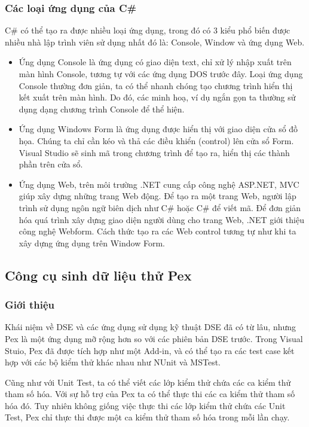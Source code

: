 \subsubsection*{Các loại ứng dụng của C\#}
C\# có thể tạo ra được nhiều loại ứng dụng, trong đó có 3 kiểu phổ biến được nhiều nhà lập trình viên sử dụng nhất đó là: Console, Window và ứng dụng Web.
\begin{itemize}
	\item Ứng dụng Console là ứng dụng có giao diện text, chỉ xử lý nhập xuất trên màn hình Console, tương tự với các ứng dụng DOS trước đây. Loại ứng dụng Console thường đơn giản, ta có thể nhanh chóng tạo chương trình hiển thị kết xuất trên màn hình. Do đó, các minh hoạ, ví dụ ngắn gọn ta thường sử dụng dạng chương trình Console để thể hiện.
	\item Ứng dụng Windows Form là ứng dụng được hiển thị với giao diện cửa sổ đồ họa. Chúng ta chỉ cần kéo và thả các điều khiển (control) lên cửa sổ Form. Visual Studio sẽ sinh mã trong chương trình để tạo ra, hiển thị các thành phần trên cửa sổ.
	\item Ứng dụng Web, trên môi trường .NET cung cấp công nghệ ASP.NET, MVC giúp xây dựng những trang Web động. Để tạo ra một trang Web, người lập trình sử dụng ngôn ngữ biên dịch như C\# hoặc C\# để viết mã. Để đơn giản hóa quá trình xây dựng giao diện người dùng cho trang Web, .NET giới thiệu công nghệ Webform. Cách thức tạo ra các Web control tương tự như khi ta xây dựng ứng dụng trên Window Form.
\end{itemize}

\subsection{Công cụ sinh dữ liệu thử Pex}
\subsubsection*{Giới thiệu}
Khái niệm về DSE và các ứng dụng sử dụng kỹ thuật DSE đã có từ lâu, nhưng Pex là một ứng dụng mỡ rộng hơn so với các phiên bản DSE trước. Trong Visual Stuio, Pex đã được tích hợp như một Add-in, và có thể tạo ra các test case kết hợp với các bộ kiểm thử khác nhau như NUnit và MSTest. 

Cũng như với Unit Test, ta có thể viết các lớp kiểm thử chứa các ca kiểm thử tham số hóa. Với sự hỗ trợ của Pex ta có thể thực thi các ca kiểm thử tham số hóa đó. Tuy nhiên không giống việc thực thi các lớp kiểm thử chứa các Unit Test, Pex chỉ thực thi được một ca kiểm thử tham số hóa trong mỗi lần chạy.

